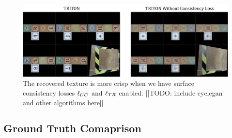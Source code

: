 \documentclass{article}
\begin{document}
    \begin{figure}[thbp]
    	\begin{center}
    		\includegraphics[width=\textwidth]{../images/blurry_recovery.pdf}
    	\end{center}
    	\caption{
    		The recovered texture is more crisp when we have surface consistency losses $\ell_{UC}$ and $\ell_{TR}$ enabled.
    		[[TODO: include cyclegan and other algorithms here]]
    	}
    	\label{fig:blurry_recovery}
    \end{figure}

	 
\subsection{Ground Truth Comaprison}
\end{document}
